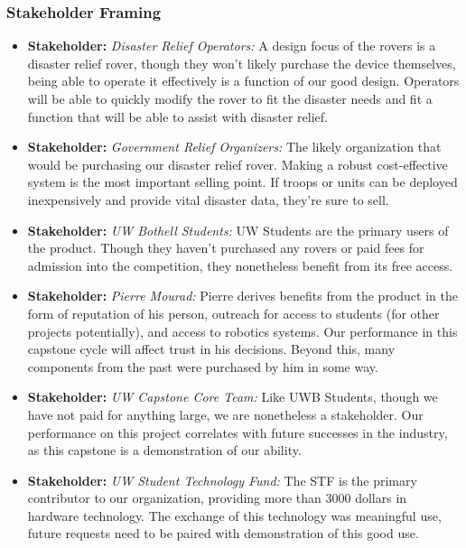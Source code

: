 \documentclass[a4paper, 10pt]{article}
\begin{document}
		\subsubsection{Stakeholder Framing}
			\begin{itemize}
			\item
			\textbf{Stakeholder:} \emph{Disaster Relief Operators:} A design focus of the rovers is a disaster relief rover, though they won't likely purchase the device themselves, being able to operate it effectively is a function of our good design. Operators will be able to quickly modify the rover to fit the disaster needs and fit a function that will be able to assist with disaster relief. 
			
			\item
\textbf{Stakeholder:} \emph{Government Relief Organizers:} The likely organization that would be purchasing our disaster relief rover. Making a robust cost-effective system is the most important selling point. If troops or units can be deployed inexpensively and provide vital disaster data, they're sure to sell. 

			\item
\textbf{Stakeholder:} \emph{UW Bothell Students:} UW Students are the primary users of the product. Though they haven't purchased any rovers or paid fees for admission into the competition, they nonetheless benefit from its free access.

			\item
\textbf{Stakeholder:} \emph{Pierre Mourad:} Pierre derives benefits from the product in the form of reputation of his person, outreach for access to students (for other projects potentially), and access to robotics systems. Our performance in this capstone cycle will affect trust in his decisions. Beyond this, many components from the past were purchased by him in some way.

			\item
\textbf{Stakeholder:} \emph{UW Capstone Core Team:} Like UWB Students, though we have not paid for anything large, we are nonetheless a stakeholder. Our performance on this project correlates with future successes in the industry, as this capstone is a demonstration of our ability.

			\item
\textbf{Stakeholder:} \emph{UW Student Technology Fund:} The STF is the primary contributor to our organization, providing more than 3000 dollars in hardware technology. The exchange of this technology was meaningful use, future requests need to be paired with demonstration of this good use.
			\end{itemize}
\end{document}
